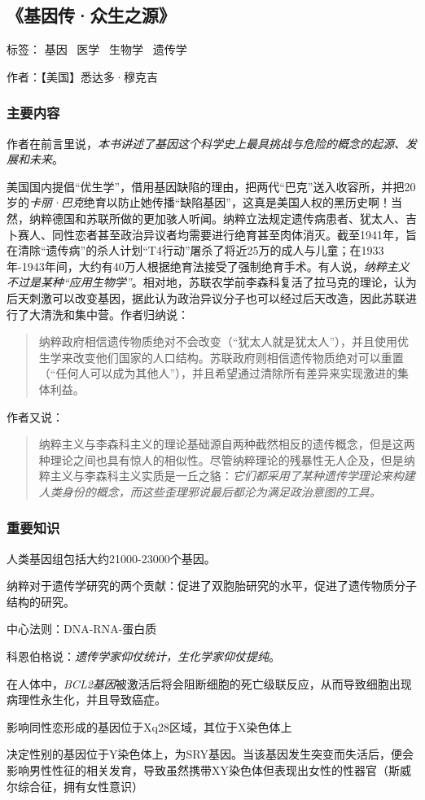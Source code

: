\subsection{《基因传·众生之源》}

标签： 基因 \  医学 \  生物学 \  遗传学

作者：【美国】悉达多·穆克吉

\subsubsection{主要内容}
作者在前言里说，\emph{本书讲述了基因这个科学史上最具挑战与危险的概念的起源、发展和未来}。

美国国内提倡“优生学”，借用基因缺陷的理由，把两代“巴克”送入收容所，并把20岁的\emph{卡丽·巴克}绝育以防止她传播“缺陷基因”，这真是美国人权的黑历史啊！当然，纳粹德国和苏联所做的更加骇人听闻。纳粹立法规定遗传病患者、犹太人、吉卜赛人、同性恋者甚至政治异议者均需要进行绝育甚至肉体消灭。截至1941年，旨在清除“遗传病”的杀人计划“T4行动”屠杀了将近25万的成人与儿童；在1933年-1943年间，大约有40万人根据绝育法接受了强制绝育手术。有人说，\emph{纳粹主义不过是某种“应用生物学”}。相对地，苏联农学前李森科复活了拉马克的理论，认为后天刺激可以改变基因，据此认为政治异议分子也可以经过后天改造，因此苏联进行了大清洗和集中营。作者归纳说：
\begin{quotation}
纳粹政府相信遗传物质绝对不会改变（“犹太人就是犹太人”），并且使用优生学来改变他们国家的人口结构。苏联政府则相信遗传物质绝对可以重置（“任何人可以成为其他人”），并且希望通过清除所有差异来实现激进的集体利益。
\end{quotation}

作者又说：
\begin{quotation}
纳粹主义与李森科主义的理论基础源自两种截然相反的遗传概念，但是这两种理论之间也具有惊人的相似性。尽管纳粹理论的残暴性无人企及，但是纳粹主义与李森科主义实质是一丘之貉：\emph{它们都采用了某种遗传学理论来构建人类身份的概念，而这些歪理邪说最后都沦为满足政治意图的工具。}
\end{quotation}

\subsubsection{重要知识}
\begin{itemize*}
	\item 人类基因组包括大约21000-23000个基因。
	\item 纳粹对于遗传学研究的两个贡献：促进了双胞胎研究的水平，促进了遗传物质分子结构的研究。
	\item 中心法则：DNA-RNA-蛋白质
	\item 科恩伯格说：\emph{遗传学家仰仗统计，生化学家仰仗提纯}。
	\item 在人体中，\emph{BCL2基因}被激活后将会阻断细胞的死亡级联反应，从而导致细胞出现病理性永生化，并且导致癌症。
	\item 影响同性恋形成的基因位于Xq28区域，其位于X染色体上
	\item 决定性别的基因位于Y染色体上，为SRY基因。当该基因发生突变而失活后，便会影响男性性征的相关发育，导致虽然携带XY染色体但表现出女性的性器官（斯威尔综合征，拥有女性意识）
\end{itemize*}

